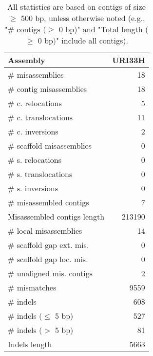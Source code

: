 \documentclass[12pt,a4paper]{article}
\begin{document}
\begin{table}[ht]
\begin{center}
\caption{All statistics are based on contigs of size $\geq$ 500 bp, unless otherwise noted (e.g., "\# contigs ($\geq$ 0 bp)" and "Total length ($\geq$ 0 bp)" include all contigs).}
\begin{tabular}{|l*{1}{|r}|}
\hline
Assembly & URI33H \\ \hline
\# misassemblies & 18 \\ \hline
\hspace{2mm}\# contig misassemblies & 18 \\ \hline
\hspace{5mm}\# c. relocations & 5 \\ \hline
\hspace{5mm}\# c. translocations & 11 \\ \hline
\hspace{5mm}\# c. inversions & 2 \\ \hline
\hspace{2mm}\# scaffold misassemblies & 0 \\ \hline
\hspace{5mm}\# s. relocations & 0 \\ \hline
\hspace{5mm}\# s. translocations & 0 \\ \hline
\hspace{5mm}\# s. inversions & 0 \\ \hline
\# misassembled contigs & 7 \\ \hline
Misassembled contigs length & 213190 \\ \hline
\# local misassemblies & 14 \\ \hline
\# scaffold gap ext. mis. & 0 \\ \hline
\# scaffold gap loc. mis. & 0 \\ \hline
\# unaligned mis. contigs & 2 \\ \hline
\# mismatches & 9559 \\ \hline
\# indels & 608 \\ \hline
\hspace{5mm}\# indels ($\leq$ 5 bp) & 527 \\ \hline
\hspace{5mm}\# indels ($>$ 5 bp) & 81 \\ \hline
Indels length & 5663 \\ \hline
\end{tabular}
\end{center}
\end{table}
\end{document}
